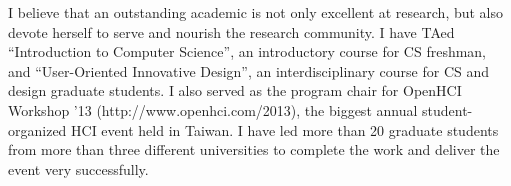 I believe that an outstanding academic is not only excellent at research, 
but also devote herself to serve and nourish the research community. 
I have TAed ``Introduction to Computer Science'', an introductory course for CS freshman, 
and ``User-Oriented Innovative Design'', an interdisciplinary course for CS and design graduate students. 
I also served as the program chair for OpenHCI Workshop '13 (http://www.openhci.com/2013), 
the biggest annual student-organized HCI event held in Taiwan. 
I have led more than 20 graduate students from more than three different universities to complete the work and deliver the event very successfully.\\



%


